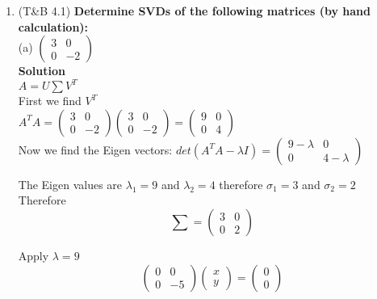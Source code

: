 \documentclass[12pt, oneside]{article}   	%
\begin{document}
\begin{enumerate}
	\setcounter{enumi}{0}
	\item (T\&B 4.1) \textbf{Determine SVDs of the following matrices (by hand calculation):}\\
	
	(a) $\left( \begin{array}{cc} 3 & 0 \\ 0 & -2  \end{array} \right)$  \quad \\
	
	\textbf{Solution}\\
	
	$A=U\sum V^T$\\
	
	First we find $V^T$ \\
	
	 $A^TA =\left( \begin{array}{cc} 3 & 0 \\ 0 & -2  \end{array} \right)\left( \begin{array}{cc} 3 & 0 \\ 0 & -2  \end{array} \right) =\left( \begin{array}{cc} 9 & 0 \\ 0 & 4  \end{array} \right)$\\
	 
	 
	 Now we find the Eigen vectors:
	 $det(A^TA- \lambda I)= \left( \begin{array}{cc} 9-\lambda & 0 \\ 0 & 4- \lambda  \end{array} \right)$
	 
	 The Eigen values are $\lambda_1=9$ and $\lambda_2=4$ therefore $\sigma_1=3$ and $\sigma_2=2$ Therefore
	 $$
	 \sum =\left( \begin{array}{cc} 3 & 0 \\ 0 & 2  \end{array} \right) 
	 $$
	 
	
	Apply $\lambda= 9$\\
	$$\left( \begin{array}{cc} 0 & 0 \\ 0 & -5  \end{array} \right) \left( \begin{array}{c} x \\ y \end{array} \right) =\left( \begin{array}{c} 0 \\ 0  \end{array} \right)$$ \\
	

\end{enumerate}
\end{document}
